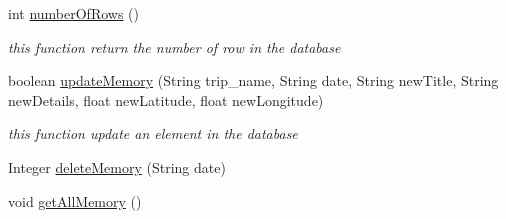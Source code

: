 \begin{DoxyCompactItemize}
int \hyperlink{classcom_1_1example_1_1memorism_1_1memory_1_1_d_b_helper_ace53414fe54d6caa930a1453ab7d237a}{number\+Of\+Rows} ()
\begin{DoxyCompactList}\small\item\em this function return the number of row in the database \end{DoxyCompactList}\item 
boolean \hyperlink{classcom_1_1example_1_1memorism_1_1memory_1_1_d_b_helper_a9a95933b868716d78333cff41127b1c9}{update\+Memory} (String trip\+\_\+name, String date, String new\+Title, String new\+Details, float new\+Latitude, float new\+Longitude)
\begin{DoxyCompactList}\small\item\em this function update an element in the database \end{DoxyCompactList}\item 
Integer \hyperlink{classcom_1_1example_1_1memorism_1_1memory_1_1_d_b_helper_a93e6cb1b1f1bc8d39aeaace04dc92446}{delete\+Memory} (String date)
\item 
void \hyperlink{classcom_1_1example_1_1memorism_1_1memory_1_1_d_b_helper_a82845616a8210bace5188f41aaef1594}{get\+All\+Memory} ()
\end{DoxyCompactItemize}
